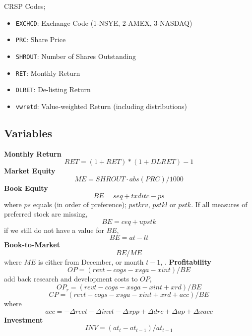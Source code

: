 CRSP Codes;
\begin{itemize}
  \item \texttt{EXCHCD}: Exchange Code (1-NSYE, 2-AMEX, 3-NASDAQ)
  \item \texttt{PRC}: Share Price
  \item \texttt{SHROUT}: Number of Shares Outstanding
  \item \texttt{RET}: Monthly Return
  \item \texttt{DLRET}: De-listing Return
  \item \texttt{vwretd}: Value-weighted Return (including distributions)
\end{itemize}

\subsection{Variables} \label{sec:variables}

\textbf{Monthly Return}
\[RET = (1 + RET) * (1 + DLRET) - 1\]
\textbf{Market Equity}
\[ME = SHROUT \cdot abs(PRC) / 1000\]
\textbf{Book Equity}
\[BE = seq + txditc - ps\]
where $ps$ equals (in order of preference); $pstkrv$, $pstkl$ or $pstk$.
If all measures of preferred stock are missing,
\[BE = ceq + upstk\]
if we still do not have a value for $BE$,
\[BE = at - lt\]
\textbf{Book-to-Market}
\[BE/ME\]
where $ME$ is either from December, \textcite{fama1992cross} or month $t-1$, 
\textcite{asness2013devil}.
\textbf{Profitability}
\[OP = (revt - cogs - xsga - xint)/BE\]
\textcite{fama2016choosing} add back research and development costs to $OP$,
\[OP_r = (revt - cogs - xsga - xint + xrd)/BE\]
\[CP = (revt - cogs - xsga - xint + xrd + acc)/BE\]
where \parencite{ball2016accruals}
\[acc = -\Delta rect -\Delta invt -\Delta xpp +\Delta drc +\Delta ap +\Delta xacc\]
\textbf{Investment}
\[INV = (at_t - at_{t-1})/at_{t-1}\]





